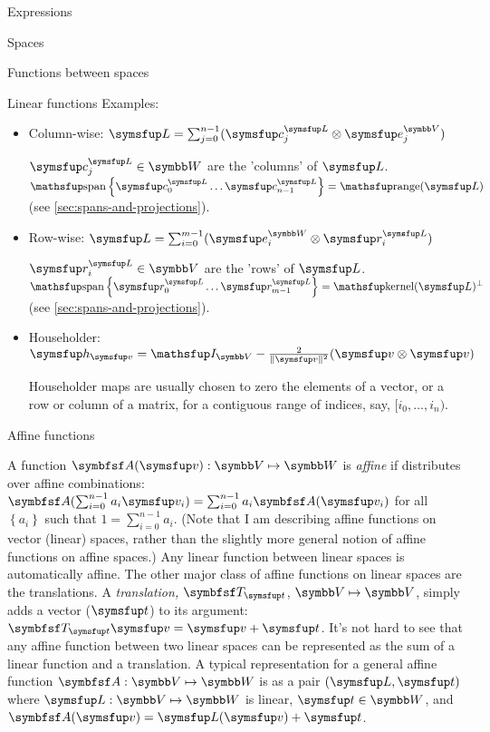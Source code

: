 \documentclass[12pt]{PalisadesLakesArticle}
\begin{document}
\begin{plSection}{Expressions}
\begin{plSection}{Spaces}
\begin{plSection}{Functions between spaces}
\begin{plSection}{Linear functions}
Examples:

\begin{itemize}

\item Column-wise:
$\Vector{L} = \sum_{j=0}^{n-1} 
( \Vector{c}_j^{\Vector{L}} \otimes \Vector{e}_j^{\Space{V}} )$

$\Vector{c}_j^{\Vector{L}} \in \Space{W}$ 
are the 'columns' of $\Vector{L}$.
$\linearspan\left\{ \Vector{c}_0^{\Vector{L}} 
\ldots \Vector{c}_{n-1}^{\Vector{L}} \right\} = \range(\Vector{L})$
(see \cref{sec:spans-and-projections}).

\item Row-wise:
$\Vector{L} = \sum_{i=0}^{m-1} ( \Vector{e}_i^{\Space{W}} \otimes  \Vector{r}_i^{\Vector{L}} )$

$\Vector{r}_i^{\Vector{L}} \in \Space{V}$ are the 'rows' of $\Vector{L}$.
$\linearspan\left\{ \Vector{r}_0^{\Vector{L}} \ldots \Vector{r}_{m-1}^{\Vector{L}} \right\} =  \kernel(\Vector{L})^{\perp}$
(see \cref{sec:spans-and-projections}).

\item Householder:
$\Vector{h}_{\Vector{v}} 
= \Identity_{\Space{V}} - \frac{2}{\| \Vector{v} \|^2} 
(\Vector{v} \otimes \Vector{v})$

Householder maps are usually chosen to zero the elements of
a vector, or a row or column of a matrix, for a contiguous range of
indices, say, $[i_0,\ldots,i_n)$.

\end {itemize}

\end{plSection}%
\begin{plSection}{Affine functions}
\label{sec:affine-functions}

A function $\Point{A}(\Vector{v}):\Space{V} \mapsto \Space{W}$
is \textit{affine} if distributes over affine combinations:
$\Point{A}(\sum_{i=0}^{n-1} 
a_i \Vector{v}_i) = \sum_{i=0}^{n-1} a_i \Point{A}(\Vector{v}_i) $
for all $\left\{a_i\right\}$ such that $1 = \sum_{i=0}^{n-1} a_i$.
(Note that I am describing affine functions on vector (linear) spaces,
rather than the slightly more general notion of affine functions on affine spaces.)
Any linear function between linear spaces is automatically affine.
The other major class of affine functions on linear spaces are the translations.
A \textit{translation,} $\Point{T}_{\Vector{t}}$, $\Space{V} \mapsto \Space{V}$,
simply adds a vector ($\Vector{t}$) to its argument:
$\Point{T}_{\Vector{t}} \Vector{v} = \Vector{v} + \Vector{t}$.
It's not hard to see that any affine function between two linear spaces
can be represented as the sum of a linear function and a translation.
A typical representation for a general affine function 
$\Point{A} : \Space{V} \mapsto \Space{W}$
is as a pair $(\Vector{L},\Vector{t})$ where $
\Vector{L} : \Space{V} \mapsto \Space{W}$ is linear,
$\Vector{t} \in \Space{W}$, and 
$\Point{A}(\Vector{v}) = \Vector{L}(\Vector{v}) + \Vector{t}$.


\end{plSection}
\end{plSection}
\end{plSection}
\end{plSection}
\end{document}
